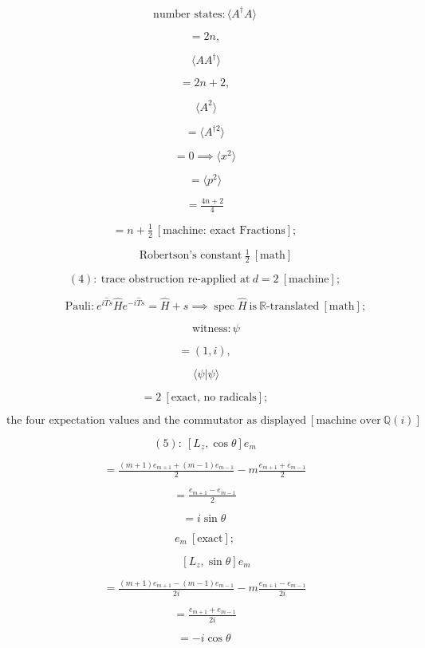 \documentclass[11pt,openany]{report}
\theoremstyle{canonplain}
\theoremstyle{canondef}
\begin{document}
\[
\text{number states}: \langle A^\dagger A\rangle
\]

\[
= 2n,
\]

\[
\ \langle AA^\dagger\rangle
\]

\[
= 2n+2,
\]

\[
\ \langle A^2\rangle
\]

\[
= \langle A^{\dagger2}\rangle
\]

\[
= 0\implies\langle x^2\rangle
\]

\[
= \langle p^2\rangle
\]

\[
= \tfrac{4n+2}4
\]

\[
= n+\tfrac12\ [\text{machine: exact Fractions}];
\]

\[
\qquad \text{Robertson's constant}\ \tfrac12\ [\text{math}]
\]

\[
(4):\ \text{trace obstruction re-applied at}\ d=2\ [\text{machine}];
\]

\[
\qquad \text{Pauli:}\ e^{i\hat T s}\hat He^{-i\hat T s}=\hat H+s\implies\operatorname{spec}\hat H\ \text{is}\ \mathbb R\text{-translated}\ [\text{math}];
\]

\[
\qquad \text{witness}: \psi
\]

\[
= (1,i),
\]

\[
\ \langle\psi|\psi\rangle
\]

\[
= 2\ [\text{exact, no radicals}];
\]

\[
\ \text{the four expectation values and the commutator as displayed}\ [\text{machine over}\ \mathbb Q(i)]
\]

\[
(5):\ [L_z,\cos\theta]e_m
\]

\[
= \tfrac{(m{+}1)e_{m+1}+(m{-}1)e_{m-1}}2-m\tfrac{e_{m+1}+e_{m-1}}2
\]

\[
= \tfrac{e_{m+1}-e_{m-1}}2
\]

\[
= i\sin\theta\,
\]

\[
e_m\ [\text{exact}];
\]

\[
\qquad [L_z,\sin\theta]e_m
\]

\[
= \tfrac{(m{+}1)e_{m+1}-(m{-}1)e_{m-1}}{2i}-m\tfrac{e_{m+1}-e_{m-1}}{2i}
\]

\[
= \tfrac{e_{m+1}+e_{m-1}}{2i}
\]

\[
= -i\cos\theta\,
\]
\end{document}
